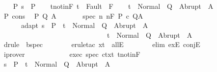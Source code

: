 \begin{isabellebody}
\ \ \isamarkupfalse%
\ P{\isacharcolon}\ {\isachardoublequoteopen}s\ {\isasymin}\ P{\isachardoublequoteclose}\isanewline
\ \ \isamarkupfalse%
\ t{\isacharunderscore}notin{\isacharunderscore}F{\isacharcolon}\ {\isachardoublequoteopen}t\ {\isasymnotin}\ Fault\ {\isacharbackquote}\ F{\isachardoublequoteclose}\isanewline
\ \ \isamarkupfalse%
\ {\isachardoublequoteopen}t\ {\isasymin}\ Normal\ {\isacharbackquote}\ Q\ {\isasymunion}\ Abrupt\ {\isacharbackquote}\ A{\isachardoublequoteclose}\isanewline
\ \ \isamarkupfalse%
\ {\isacharminus}\isanewline
\ \ \ \ \isamarkupfalse%
\ P\ cons\ \isamarkupfalse%
\ P{\isacharprime}\ Q{\isacharprime}\ A{\isacharprime}\ \isanewline
\ \ \ \ \ \ spec{\isacharcolon}\ {\isachardoublequoteopen}{\isasymforall}n{\isachardot}\ {\isasymGamma}{\isacharcomma}{\isasymTheta}{\isasymTurnstile}n{\isacharcolon}\isactrlbsub {\isacharslash}F\isactrlesub \ P{\isacharprime}\ c\ Q{\isacharprime}{\isacharcomma}A{\isacharprime}{\isachardoublequoteclose}\ \isanewline
\ \ \ \ \ \ adapt{\isacharcolon}\ {\isachardoublequoteopen}{\isacharparenleft}s\ {\isasymin}\ P{\isacharprime}\ {\isasymlongrightarrow}\ t\ {\isasymin}\ Normal\ {\isacharbackquote}\ Q{\isacharprime}\ {\isasymunion}\ Abrupt\ {\isacharbackquote}\ A{\isacharprime}{\isacharparenright}\isanewline
\ \ \ \ \ \ \ \ \ \ \ \ \ \ \ \ \ \ \ \ \ \ \ \ \ \ \ \ \ \ {\isasymlongrightarrow}\ t\ {\isasymin}\ Normal\ {\isacharbackquote}\ Q\ {\isasymunion}\ Abrupt\ {\isacharbackquote}\ A{\isachardoublequoteclose}\isanewline
\ \ \ \ \ \ \isamarkupfalse%
\ {\isacharminus}\isanewline
\ \ \ \ \ \ \isamarkupfalse%
\ {\isacharparenleft}drule\ {\isacharparenleft}{}{\isacharparenright}\ bspec{\isacharparenright}\isanewline
\ \ \ \ \ \ \isamarkupfalse%
\ {\isacharparenleft}erule{\isacharunderscore}tac\ x{\isacharequal}t\ \ allE{\isacharparenright}\isanewline
\ \ \ \ \ \ \isamarkupfalse%
\ {\isacharparenleft}elim\ exE\ conjE{\isacharparenright}\isanewline
\ \ \ \ \ \ \isamarkupfalse%
\ iprover\isanewline
\ \ \ \ \ \ \isamarkupfalse%
\isanewline
\ \ \ \ \isamarkupfalse%
\ exec\ spec\ ctxt\ t{\isacharunderscore}notin{\isacharunderscore}F\isanewline
\ \ \ \ \isamarkupfalse%
\ {\isachardoublequoteopen}s\ {\isasymin}\ P{\isacharprime}\ {\isasymlongrightarrow}\ t\ {\isasymin}\ Normal\ {\isacharbackquote}\ Q{\isacharprime}\ {\isasymunion}\ Abrupt\ {\isacharbackquote}\ A{\isacharprime}{\isachardoublequoteclose}\isanewline

\end{isabellebody}
